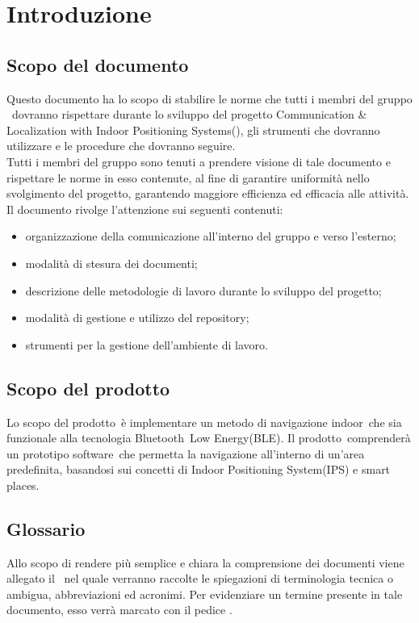 \documentclass[../NormeProgetto.tex]{subfiles}
\begin{document}
\section{Introduzione}
	\subsection{Scopo del documento}
	Questo documento ha lo scopo di stabilire le norme che tutti i membri del gruppo \leaf\ dovranno rispettare durante lo sviluppo del progetto Communication \& Localization with Indoor Positioning Systems(\progetto\g), gli strumenti che dovranno utilizzare e le procedure che dovranno seguire. \\
	Tutti i membri del gruppo sono tenuti a prendere visione di tale documento e rispettare le norme in esso contenute, al fine di garantire uniformità nello svolgimento del progetto, garantendo maggiore efficienza ed efficacia alle attività. \\
	Il documento rivolge l'attenzione sui seguenti contenuti:
	\begin{itemize}
	\item organizzazione della comunicazione all'interno del gruppo e verso l'esterno;
	\item modalità di stesura dei documenti;
	\item descrizione delle metodologie di lavoro durante lo sviluppo del progetto;
	\item modalità di gestione e utilizzo del repository\g;
	\item strumenti per la gestione dell'ambiente di lavoro.
	\end{itemize}

	\subsection{Scopo del prodotto}
	Lo scopo del prodotto\g\ è implementare un metodo di navigazione indoor\g\ che sia funzionale alla tecnologia Bluetooth\g\ Low Energy(BLE\g).
	Il prodotto\g\ comprenderà un prototipo software\g\ che permetta la navigazione all’interno di un’area predefinita, basandosi sui concetti di Indoor Positioning System(IPS\g) e smart places\g.

	\subsection{Glossario}
	Allo scopo di rendere più semplice e chiara la comprensione dei documenti viene allegato il \glossariov\ nel quale verranno raccolte le spiegazioni di  terminologia tecnica o  ambigua, abbreviazioni ed acronimi. Per evidenziare un termine presente in tale documento, esso verrà marcato con il pedice \g.
\end{document}
